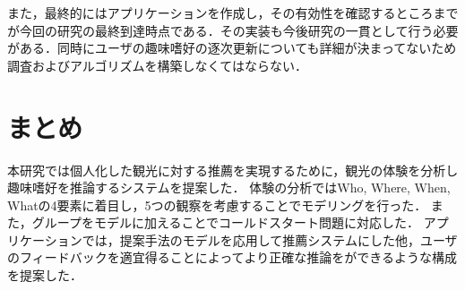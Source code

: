 \documentclass[a4j,10pt, twocolumn]{jarticle}
\begin{document}
また，最終的にはアプリケーションを作成し，その有効性を確認するところまでが今回の研究の最終到達時点である．その実装も今後研究の一貫として行う必要がある．同時にユーザの趣味嗜好の逐次更新についても詳細が決まってないため調査およびアルゴリズムを構築しなくてはならない．

\section{まとめ} \label{summary}
本研究では個人化した観光に対する推薦を実現するために，観光の体験を分析し趣味嗜好を推論するシステムを提案した．
体験の分析ではWho, Where, When, Whatの4要素に着目し，5つの観察を考慮することでモデリングを行った．
また，グループをモデルに加えることでコールドスタート問題に対応した．
アプリケーションでは，提案手法のモデルを応用して推薦システムにした他，ユーザのフィードバックを適宜得ることによってより正確な推論をができるような構成を提案した．



\end{document}
